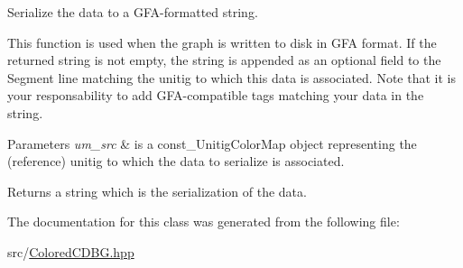 Serialize the data to a G\+F\+A-\/formatted string. 

This function is used when the graph is written to disk in G\+FA format. If the returned string is not empty, the string is appended as an optional field to the Segment line matching the unitig to which this data is associated. Note that it is your responsability to add G\+F\+A-\/compatible tags matching your data in the string. 
\begin{DoxyParams}{Parameters}
{\em um\+\_\+src} & is a const\+\_\+\+Unitig\+Color\+Map object representing the (reference) unitig to which the data to serialize is associated. \\
\hline
\end{DoxyParams}
\begin{DoxyReturn}{Returns}
a string which is the serialization of the data. 
\end{DoxyReturn}


The documentation for this class was generated from the following file\+:\begin{DoxyCompactItemize}
\item 
src/\hyperlink{ColoredCDBG_8hpp}{Colored\+C\+D\+B\+G.\+hpp}\end{DoxyCompactItemize}
